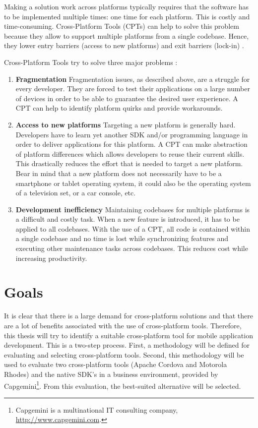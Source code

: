 Making a solution work across platforms typically requires that the software has to be implemented multiple times: one time for each platform. This is costly and time-consuming. Cross-Platform Tools (CPTs) can help to solve this problem because they allow to support multiple platforms from a single codebase. Hence, they lower entry barriers (access to new platforms) and exit barriers (lock-in) \cite{VMCPT:2012}. 

Cross-Platform Tools try to solve three major problems \cite{VMCPT:2012}: 

\begin{enumerate}
    \item \textbf{Fragmentation} Fragmentation issues, as described above, are a struggle for every developer. They are forced to test their applications on a large number of devices in order to be able to guarantee the desired user experience. A CPT can help to identify platform quirks and provide workarounds. 
    \item \textbf{Access to new platforms} Targeting a new platform is generally hard. Developers have to learn yet another SDK and/or programming language in order to deliver applications for this platform. A CPT can make abstraction of platform differences which allows developers to reuse their current skills. This drastically reduces the effort that is needed to target a new platform. Bear in mind that a new platform does not necessarily have to be a smartphone or tablet operating system, it could also be the operating system of a television set, or a car console, etc.
    \item \textbf{Development inefficiency} Maintaining codebases for multiple platforms is a difficult and costly task. When a new feature is introduced, it has to be applied to all codebases. With the use of a CPT, all code is contained within a single codebase and no time is lost while synchronizing features and executing other maintenance tasks across codebases. This reduces cost while increasing productivity. 
\end{enumerate}

\section{Goals}

It is clear that there is a large demand for cross-platform solutions and that there are a lot of benefits associated with the use of cross-platform tools. Therefore, this thesis will try to identify a suitable cross-platform tool for mobile application development. This is a two-step process. First, a methodology will be defined for evaluating and selecting cross-platform tools. Second, this methodology will be used to evaluate two cross-platform tools (Apache Cordova and Motorola Rhodes) and the native SDK's in a business environment, provided by Capgemini\footnote{Capgemini is a multinational IT consulting company, \url{http://www.capgemini.com}.}. From this evaluation, the best-suited alternative will be selected. 